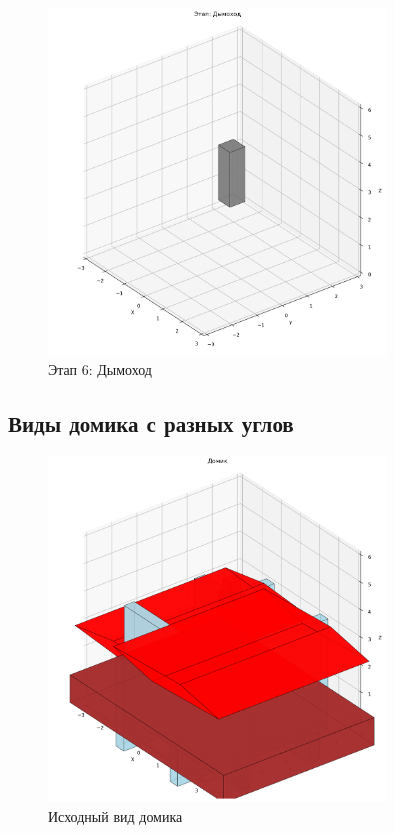 \begin{figure}[H]
\centering
\includegraphics[width=0.8\textwidth]{images/task8/construction_дымоход.png}
\caption{Этап 6: Дымоход}
\end{figure}

\subsection*{Виды домика с разных углов}

\begin{figure}[H]
\centering
\includegraphics[width=0.8\textwidth]{images/task8/house_original.png}
\caption{Исходный вид домика}
\end{figure}

